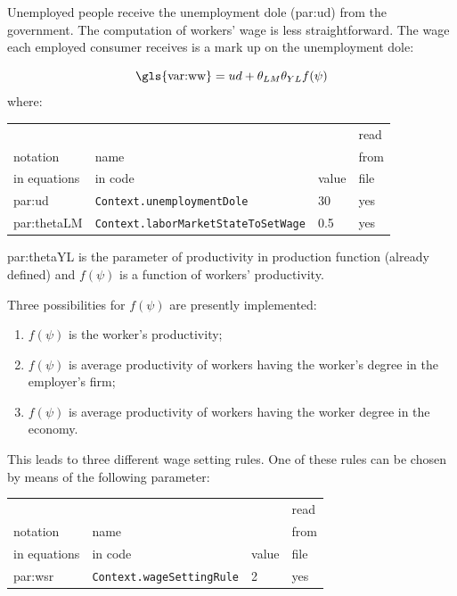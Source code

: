 \documentclass{book}
\begin{document}
Unemployed people receive the unemployment dole (\gls{par:ud}) from the government.
The computation of workers' wage is less straightforward. The wage each employed consumer receives is a mark up on the unemployment dole: 

\begin{equation}
	\textnormal{\gls{var:ww}}=ud+\theta_{LM}\theta_{YL}f(\psi)
	\label{eq:ww}
\end{equation}
where:\\

\vskip2mm
\noindent
\begin{tabular}{l l l l}
	\hline
	& &&read\\
	notation& name &&from\\
	in equations& in code&value&file\\
	\hline
	\hline
\gls{par:ud}&\verb+Context.unemploymentDole+&30&yes\\
\gls{par:thetaLM}&\verb+Context.laborMarketStateToSetWage+&0.5&yes\\
	\hline
\end{tabular}

\vskip2mm
\gls{par:thetaYL} is the parameter of productivity in production function (already defined) and $f(\psi)$ is a function of workers' productivity.

Three possibilities for $f(\psi)$ are presently implemented:
\begin{enumerate}
	\item $f(\psi)$ is the worker's productivity;
	\item $f(\psi)$ is average productivity of workers having the worker's degree in the employer's firm;
	\item $f(\psi)$ is average productivity of workers having the worker degree in the economy.
\end{enumerate}


This leads to three different wage setting rules. One of these rules can be chosen by means of the following parameter:\\
\vskip2mm
\noindent
\begin{tabular}{l l l l}
	\hline
	& &&read\\
	notation& name &&from\\
	in equations& in code&value&file\\
	\hline
	\hline
\gls{par:wsr}&\verb+Context.wageSettingRule+&2&yes\\
	\hline
\end{tabular}
\end{document}
